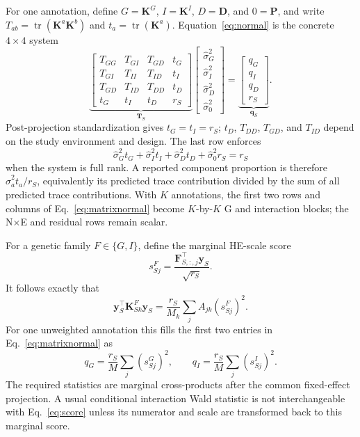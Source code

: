 \documentclass[11pt]{article}
\newcommand{\tr}{\operatorname{tr}}
\newcommand{\bP}{\bm P}
\newcommand{\bK}{\bm K}
\newcommand{\by}{\bm y}
\newcommand{\bD}{\bm D}
\begin{document}
For one annotation, define $G=\bK^G$, $I=\bK^I$, $D=\bD$, and $0=\bP$,
and write $T_{ab}=\tr(\bK^a\bK^b)$ and
$t_a=\tr(\bK^a)$.  Equation~\eqref{eq:normal} is the concrete $4\times4$
system
\begin{equation}
\underbrace{\begin{bmatrix}
 T_{GG}&T_{GI}&T_{GD}&t_G\\
 T_{GI}&T_{II}&T_{ID}&t_I\\
 T_{GD}&T_{ID}&T_{DD}&t_D\\
 t_G&t_I&t_D&r_S
\end{bmatrix}}_{\bm T_S}
\begin{bmatrix}
 \widehat\sigma_G^2\\ \widehat\sigma_I^2\\
 \widehat\sigma_D^2\\ \widehat\sigma_0^2
\end{bmatrix}
=
\underbrace{\begin{bmatrix}
 q_G\\q_I\\q_D\\r_S
\end{bmatrix}}_{\bm q_S}.
\label{eq:matrixnormal}
\end{equation}
Post-projection standardization gives $t_G=t_I=r_S$; $t_D$, $T_{DD}$,
$T_{GD}$, and $T_{ID}$ depend on the study environment and design.  The
last row enforces
\begin{equation}
 \widehat\sigma_G^2t_G+\widehat\sigma_I^2t_I+
 \widehat\sigma_D^2t_D+\widehat\sigma_0^2r_S=r_S
 \label{eq:variancebalance}
\end{equation}
when the system is full rank.  A reported component proportion is therefore
$\widehat\sigma_a^2t_a/r_S$, equivalently its predicted trace contribution
divided by the sum of all predicted trace contributions.  With $K$
annotations, the first two rows and columns of Eq.~\eqref{eq:matrixnormal}
become $K$-by-$K$ G and interaction blocks; the N$\times$E and residual rows
remain scalar.

For a genetic family $F\in\{G,I\}$, define the marginal HE-scale score
\begin{equation}
 s^F_{Sj}=\frac{\bm F_{S,:,j}^\top\by_S}{\sqrt{r_S}}.
 \label{eq:score}
\end{equation}
It follows exactly that
\begin{equation}
 \by_S^\top\bK^F_{Sk}\by_S
 =\frac{r_S}{M_k}\sum_j A_{jk}(s^F_{Sj})^2.
 \label{eq:rhs}
\end{equation}
For one unweighted annotation this fills the first two entries in
Eq.~\eqref{eq:matrixnormal} as
\begin{equation}
 q_G=\frac{r_S}{M}\sum_j(s^G_{Sj})^2,\qquad
 q_I=\frac{r_S}{M}\sum_j(s^I_{Sj})^2.
 \label{eq:twogeneticrhs}
\end{equation}
The required statistics are marginal cross-products after the common
fixed-effect projection.  A usual conditional interaction Wald statistic is
not interchangeable with Eq.~\eqref{eq:score} unless its numerator and scale
are transformed back to this marginal score.
\end{document}
